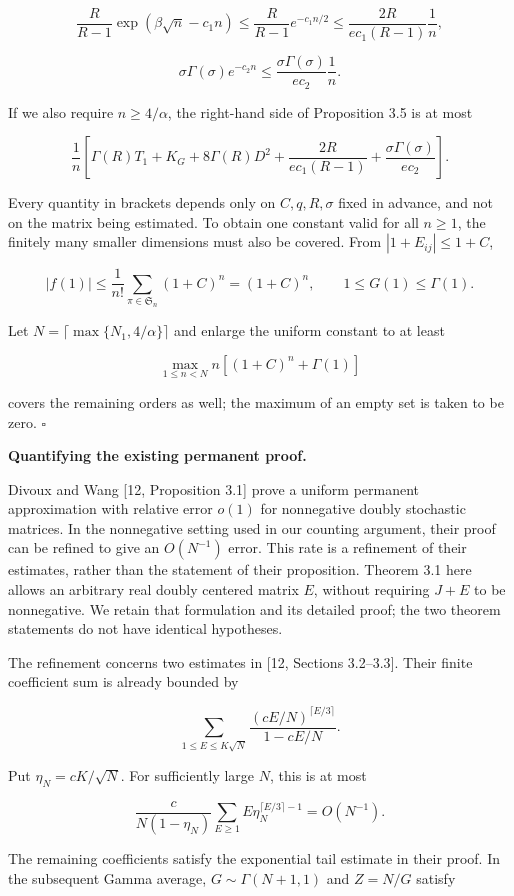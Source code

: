 \documentclass[11pt,a4paper]{article}
\begin{document}
\[
\frac R{R-1}\exp(\beta\sqrt n-c_1n)
\le\frac R{R-1}e^{-c_1n/2}
\le\frac{2R}{ec_1(R-1)}\frac1n,
\]

\[
\sigma\Gamma(\sigma)e^{-c_2n}
\le\frac{\sigma\Gamma(\sigma)}{ec_2}\frac1n.
\]

If we also require \(n\ge4/\alpha\), the right-hand side of Proposition 3.5 is at most

\[
\frac1n\left[
\Gamma(R)T_1+K_G+8\Gamma(R)D^2
+\frac{2R}{ec_1(R-1)}
+\frac{\sigma\Gamma(\sigma)}{ec_2}\right].
\]

Every quantity in brackets depends only on \(C,q,R,\sigma\) fixed in advance, and not on the matrix being estimated. To obtain one constant valid for all \(n\ge1\), the finitely many smaller dimensions must also be covered. From \(|1+E_{ij}|\le1+C\),

\[
|f(1)|\le\frac1{n!}\sum_{\pi\in \mathfrak S_n}(1+C)^n=(1+C)^n,
\qquad 1\le G(1)\le\Gamma(1).
\]

Let \(N=\lceil\max\{N_1,4/\alpha\}\rceil\) and enlarge the uniform constant to at least

\[
\max_{1\le n<N}n\left[(1+C)^n+\Gamma(1)\right]
\]

covers the remaining orders as well; the maximum of an empty set is taken to be zero. \(\square\)

\textbf{Quantifying the existing permanent proof.}

Divoux and Wang {[}12, Proposition 3.1{]} prove a uniform permanent approximation with relative error \(o(1)\) for nonnegative doubly stochastic matrices. In the nonnegative setting used in our counting argument, their proof can be refined to give an \(O(N^{-1})\) error. This rate is a refinement of their estimates, rather than the statement of their proposition. Theorem 3.1 here allows an arbitrary real doubly centered matrix \(E\), without requiring \(J+E\) to be nonnegative. We retain that formulation and its detailed proof; the two theorem statements do not have identical hypotheses.

The refinement concerns two estimates in {[}12, Sections 3.2--3.3{]}. Their finite coefficient sum is already bounded by

\[
\sum_{1\le E\le K\sqrt N}
\frac{(cE/N)^{\lceil E/3\rceil}}{1-cE/N}.
\]

Put \(\eta_N=cK/\sqrt N\). For sufficiently large \(N\), this is at most

\[
\frac{c}{N(1-\eta_N)}
\sum_{E\ge1}E\eta_N^{\lceil E/3\rceil-1}
=O(N^{-1}).
\]

The remaining coefficients satisfy the exponential tail estimate in their proof. In the subsequent Gamma average, \(G\sim\Gamma(N+1,1)\) and \(Z=N/G\) satisfy
\end{document}
